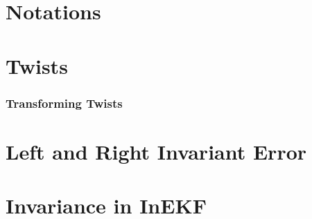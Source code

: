 \documentclass[report.tex]{subfiles}
\begin{document}
    
    \section{Notations} \label{subsec:notations}
    
   
    
    \section{Twists} \label{subsec:twists}
    
    \subsubsection*{Transforming Twists} \label{subsec:transformingTwists}
    

    
    
    \section{Left and Right Invariant Error} \label{sec:LeftAndRightInvariantError}
    \section{Invariance in InEKF} \label{sec:InvarianceInInEKF}
    
\end{document}

